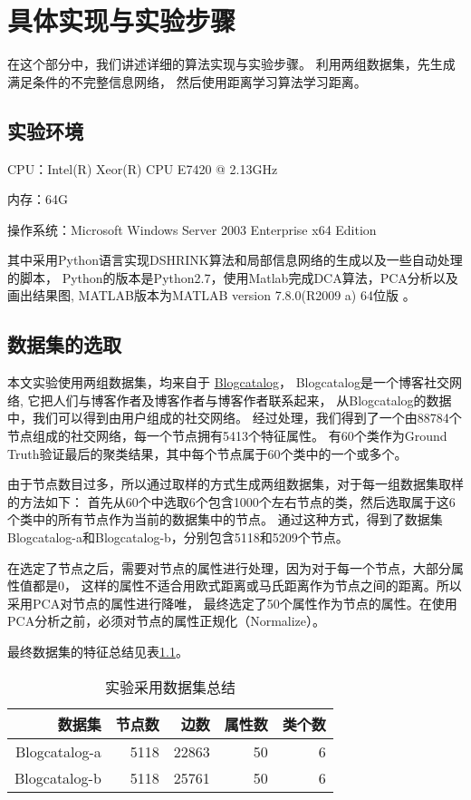 \chapter{具体实现与实验步骤}
\label{chap:implementation}

在这个部分中，我们讲述详细的算法实现与实验步骤。
利用两组数据集，先生成满足条件的不完整信息网络，
然后使用距离学习算法学习距离。

\section{实验环境}

CPU：Intel(R) Xeor(R) CPU E7420 @ 2.13GHz

内存：64G

操作系统：Microsoft Windows Server 2003 Enterprise x64 Edition

其中采用Python语言实现DSHRINK算法和局部信息网络的生成以及一些自动处理的脚本，
Python的版本是Python2.7，使用Matlab完成DCA算法，PCA分析以及画出结果图,
MATLAB版本为MATLAB version 7.8.0(R2009 a) 64位版 。

\section{数据集的选取}
\label{sec:imple:dataset}

本文实验使用两组数据集，均来自于
\href{http://www.blogcatalog.com/}{Blogcatalog}，
Blogcatalog是一个博客社交网络, 它把人们与博客作者及博客作者与博客作者联系起来，
从Blogcatalog的数据中，我们可以得到由用户组成的社交网络。
经过处理，我们得到了一个由88784个节点组成的社交网络，每一个节点拥有5413个特征属性。
有60个类作为Ground Truth验证最后的聚类结果，其中每个节点属于60个类中的一个或多个。

由于节点数目过多，所以通过取样的方式生成两组数据集，对于每一组数据集取样的方法如下：
首先从60个中选取6个包含1000个左右节点的类，然后选取属于这6个类中的所有节点作为当前的数据集中的节点。
通过这种方式，得到了数据集Blogcatalog-a和Blogcatalog-b，分别包含5118和5209个节点。

在选定了节点之后，需要对节点的属性进行处理，因为对于每一个节点，大部分属性值都是0，
这样的属性不适合用欧式距离或马氏距离作为节点之间的距离。所以采用PCA对节点的属性进行降唯，
最终选定了50个属性作为节点的属性。在使用PCA分析之前，必须对节点的属性正规化（Normalize）。

最终数据集的特征总结见表\ref{tab:datasetsummary}。

\begin{table}[!hpb]
  \centering
  \caption{实验采用数据集总结}
  \label{tab:datasetsummary}
  \begin{tabular}{rrrrr} \toprule
    数据集 & 节点数 & 边数  & 属性数 & 类个数\\ \midrule
    Blogcatalog-a & 5118 & 22863 & 50 & 6 \\
    Blogcatalog-b & 5118 & 25761  & 50 & 6 \\ \bottomrule
  \end{tabular}
\end{table}


